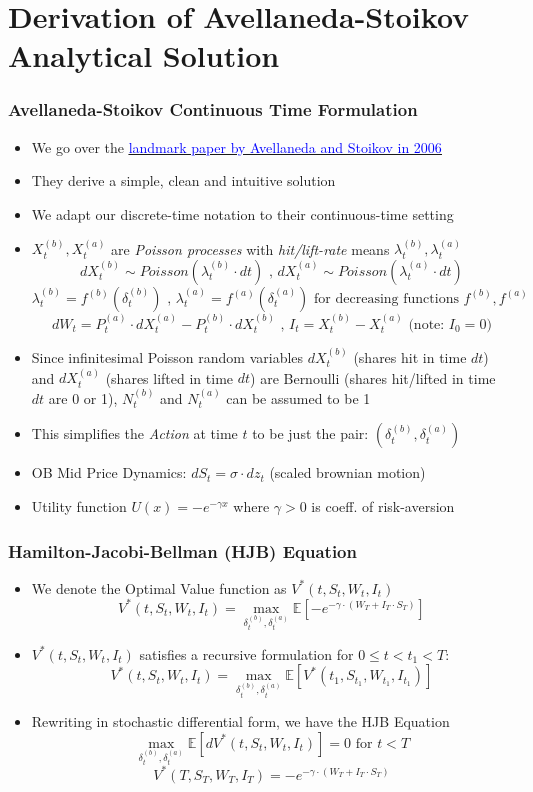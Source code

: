 \documentclass[handout]{beamer}
\begin{document}
\section{Derivation of Avellaneda-Stoikov Analytical Solution}
\begin{frame}
\frametitle{Avellaneda-Stoikov Continuous Time Formulation}
\pause
\begin{itemize}[<+->]
\item We go over the \href{https://www.math.nyu.edu/faculty/avellane/HighFrequencyTrading.pdf}{\underline{\textcolor{blue}{landmark paper by Avellaneda and Stoikov in 2006}}}
\item They derive a simple, clean and intuitive solution
\item We adapt our discrete-time notation to their continuous-time setting
\item $X_t^{(b)}, X_t^{(a)}$ are {\em Poisson processes} with {\em hit/lift-rate} means $\lambda_t^{(b)}, \lambda_t^{(a)}$
$$dX_t^{(b)} \sim Poisson(\lambda_t^{(b)} \cdot dt) \mbox{ , } dX_t^{(a)} \sim Poisson(\lambda_t^{(a)} \cdot dt)$$
$$\lambda_t^{(b)} = f^{(b)}(\delta_t^{(b)}) \mbox{ , } \lambda_t^{(a)} = f^{(a)}(\delta_t^{(a)}) \mbox{ for decreasing functions } f^{(b)}, f^{(a)}$$
$$dW_t = P_t^{(a)} \cdot dX_t^{(a)} - P_t^{(b)} \cdot dX_t^{(b)} \mbox{ , } I_t = X_t^{(b)} - X_t^{(a)} \mbox{ (note: } I_0 = 0 \mbox{)}$$
\item Since infinitesimal Poisson random variables $dX_t^{(b)}$ (shares hit in time $dt$) and $dX_t^{(a)}$ (shares lifted in time $dt$) are Bernoulli (shares hit/lifted in time $dt$ are 0 or 1), $N_t^{(b)}$ and $N_t^{(a)}$ can be assumed to be 1
\item This simplifies the {\em Action} at time $t$ to be just the pair: $(\delta_t^{(b)}, \delta_t^{(a)})$
\item OB Mid Price Dynamics: $dS_t = \sigma \cdot dz_t$ (scaled brownian motion)
\item Utility function $U(x) = -e^{-\gamma x}$ where $\gamma > 0$ is coeff. of risk-aversion  
\end{itemize}
\end{frame}

\begin{frame}
\frametitle{Hamilton-Jacobi-Bellman (HJB) Equation}
\pause
\begin{itemize}[<+->]
\item We denote the Optimal Value function as $V^*(t, S_t, W_t, I_t)$
$$V^*(t, S_t, W_t, I_t) = \max_{\delta_t^{(b)}, \delta_t^{(a)}} \mathbb{E}[-e^{-\gamma \cdot (W_T + I_T \cdot S_T)}]$$
\item $V^*(t, S_t, W_t, I_t)$ satisfies a recursive formulation for $0 \leq t < t_1 < T$:
$$V^*(t, S_t, W_t, I_t) = \max_{\delta_t^{(b)}, \delta_t^{(a)}} \mathbb{E}[V^*(t_1, S_{t_1}, W_{t_1}, I_{t_1})]$$
\item Rewriting in stochastic differential form, we have the HJB Equation
$$\max_{\delta_t^{(b)}, \delta_t^{(a)}} \mathbb{E}[dV^*(t, S_t, W_t, I_t)] = 0 \mbox{ for } t < T$$
$$V^*(T, S_T, W_T, I_T) = -e^{-\gamma \cdot (W_T + I_T \cdot S_T)}$$
\end{itemize}
\end{frame}
\end{document}

